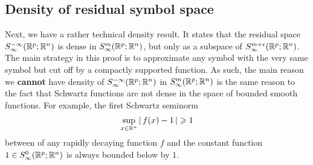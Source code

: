 \documentclass[12pt]{article}
\begin{document}
\subsection{Density of residual symbol space} 
Next, we have a rather technical density result. It states that the residual space $S^{-\infty}_\infty({\mathbb R}^{p}; {\mathbb R}^n)$ is dense in $S^{m}_\infty({\mathbb R}^p; {\mathbb R}^n)$, but only as a subspace of $S^{m + \epsilon}_\infty({\mathbb R}^{p}; {\mathbb R}^n)$. The main strategy in this proof is to approximate any symbol with the very same symbol but cut off by a compactly supported function. As such, the main reason we \textbf{cannot} have density of $S^{-\infty}_\infty({\mathbb R}^p; {\mathbb R}^n)$ in $S^m_\infty({\mathbb R}^p; {\mathbb R}^n)$ is the same reason to the fact that Schwartz functions are not dense in the space of bounded smooth functions. For example, the first Schwartz seminorm
\begin{align*}
\sup_{x \in {\ensuremath {\mathbb R}}^n} \left|\, f(x) - 1\,\right| \geqslant 1
\end{align*}
between of any rapidly decaying function $f$ and the constant function $1 \in S^{0}_\infty({\mathbb R}^{p}; {\mathbb R}^n)$ is always bounded below by $1$.
\end{document}

